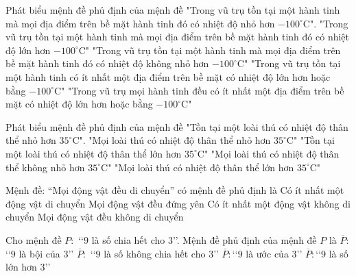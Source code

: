 \begin{ex}%
	Phát biểu mệnh đề phủ định của mệnh đề "Trong  vũ trụ tồn tại một hành tinh mà mọi địa điểm trên bề mặt hành tinh đó có nhiệt độ nhỏ hơn $-100^\circ $C".
	 \choice
		{"Trong vũ trụ tồn  tại một hành tinh mà mọi địa điểm trên bề mặt hành tinh đó có nhiệt độ lớn hơn $-100^\circ $C"}
		{"Trong  vũ trụ tồn tại một hành tinh mà mọi địa điểm trên bề mặt hành tinh đó có nhiệt độ không nhỏ hơn $-100^\circ $C"}
		{"Trong vũ trụ tồn tại một hành tinh có ít nhất một địa điểm trên bề mặt có nhiệt độ lớn  hơn hoặc bằng $-100^\circ $C"}
		{\True "Trong vũ trụ mọi hành tinh đều có ít nhất một địa điểm  trên bề mặt có nhiệt độ lớn hơn hoặc bằng $-100^\circ $C"}
\end{ex}

\begin{ex}%
	Phát biểu mệnh đề  phủ định của mệnh đề "Tồn tại một loài thú có nhiệt độ thân thể nhỏ hơn $35^\circ$C".
	\choice 
		{"Mọi loài thú có nhiệt độ thân thể  nhỏ hơn $35^\circ$C"}
		{"Tồn tại một loài thú có nhiệt  độ thân thể lớn hơn $35^\circ$C"}
		{\True "Mọi loài thú có nhiệt độ thân thể  không nhỏ hơn $35^\circ$C"}
		{"Mọi loài thú có nhiệt độ thân thể lớn hơn $35^\circ$C"} 
\end{ex}

\begin{ex}%
	Mệnh đề: “Mọi động vật đều di chuyển” có mệnh  đề phủ định là
	 \choice
		{Có  ít nhất một động vật di chuyển}
		{Mọi động  vật đều đứng yên}
		{\True Có ít nhất  một động vật không di chuyển}
		{Mọi động  vật đều không di chuyển}
\end{ex}

\begin{ex}%
	 Cho mệnh đề $P\colon$ \lq\lq $9$ là số chia hết cho $3$\rq\rq. Mệnh đề phủ định của mệnh đề $P$ là
	\choice 
		{$\overline{P}\colon$\lq\lq  $9$ là bội của $3$\rq\rq}
		{\True $\overline{P}\colon$ \lq\lq  $9$ là số không chia hết cho $3$\rq\rq}
		{$\overline{P}\colon$\lq\lq $9$  là ước của $3$\rq\rq}
		{$\overline{P}\colon$\lq\lq $9$ là số lớn hơn $3$\rq\rq} 
\end{ex}

